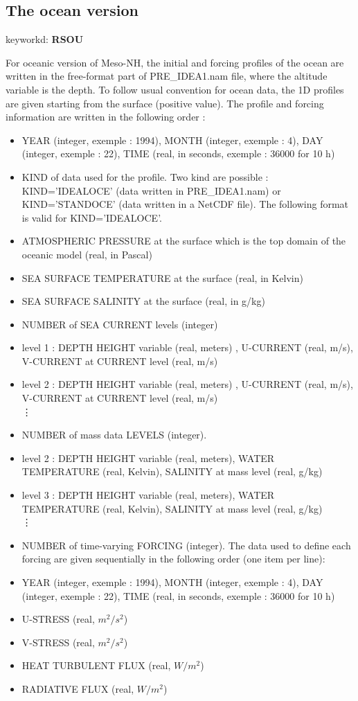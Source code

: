 \subsection{The ocean version} \label{ss:ocean_iniprofile}

keyworkd: {\bf RSOU}

For oceanic version of Meso-NH, the initial and forcing profiles of the ocean are written in the free-format part of PRE\_IDEA1.nam file, where
the altitude variable is the depth. To follow usual convention for ocean data, the 1D profiles are given starting from the surface (positive value).
The profile and forcing information are written in the following order :
\begin{itemize}
\item YEAR (integer, exemple : 1994), MONTH (integer, exemple : 4), DAY (integer, exemple
: 22), TIME (real, in seconds, exemple : 36000 for 10 h)
\item KIND of data used for the profile. Two kind are possible : KIND='IDEALOCE' (data written in PRE\_IDEA1.nam) or KIND='STANDOCE' (data written in a NetCDF file). The following format is valid for KIND='IDEALOCE'.
\item ATMOSPHERIC PRESSURE at the surface which is the top domain of the oceanic model (real, in Pascal)
\item SEA SURFACE TEMPERATURE at the surface (real, in Kelvin)
\item SEA SURFACE SALINITY at the surface (real, in g/kg)
\item NUMBER of SEA CURRENT levels (integer)
\item level 1 : DEPTH HEIGHT variable (real, meters) , U-CURRENT (real, m/s), V-CURRENT at CURRENT level (real, m/s)
\item level 2 : DEPTH HEIGHT variable (real, meters) , U-CURRENT (real, m/s), V-CURRENT at CURRENT level (real, m/s)\\
  \vdots

\item NUMBER of mass data LEVELS (integer).
\item level 2 : DEPTH HEIGHT variable (real, meters), WATER TEMPERATURE (real, Kelvin), SALINITY at mass level (real, g/kg)
\item level 3 : DEPTH HEIGHT variable (real, meters), WATER TEMPERATURE (real, Kelvin), SALINITY at mass level (real, g/kg)\\
 \vdots

\item NUMBER of time-varying FORCING (integer). The data used to define each forcing are given sequentially in the
following order (one item per line):
\item YEAR (integer, exemple : 1994), MONTH (integer, exemple : 4), DAY (integer, exemple
: 22), TIME (real, in seconds, exemple : 36000 for 10 h)
\item U-STRESS  (real, $m^2/s^2$)
\item V-STRESS  (real, $m^2/s^2$)
\item HEAT TURBULENT FLUX (real, $W/m^2$)
\item RADIATIVE FLUX (real, $W/m^2$)
\end{itemize}
